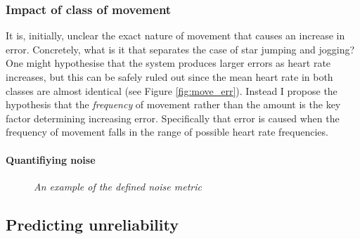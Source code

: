 \subsubsection{Impact of class of movement}
It is, initially, unclear the exact nature of movement that causes an increase in error. Concretely, what is it that separates the case of star jumping and jogging? 
One might hypothesise that the system produces larger errors as heart rate increases, but this can be safely ruled out since the mean heart rate in both classes are almost identical (see Figure \ref{fig:move_err}).
Instead I propose the hypothesis that the \textit{frequency} of movement rather than the amount is the key factor determining increasing error. Specifically that error is caused when the frequency of movement
falls in the range of possible heart rate frequencies.


\paragraph{Quantifiying noise}
\begin{figure}[H]
    \centering
    \subfloat[]{\scalebox{0.5}{}}%
    \subfloat[]{\scalebox{0.5}{ }}%
    \quad
    \subfloat[]{\scalebox{0.5}{ }}%
   \caption{\textit{An example of the defined noise metric} }
\end{figure}



\subsection{Predicting unreliability}


